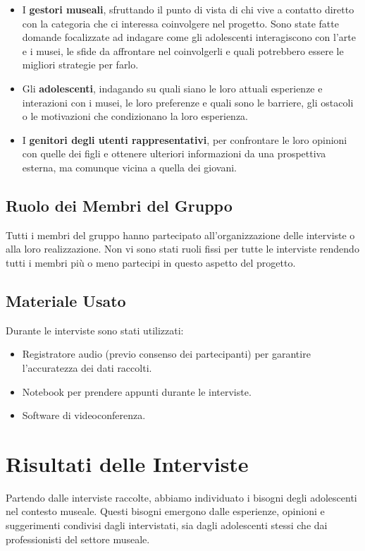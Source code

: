 \documentclass{article}
\begin{document}
\begin{itemize}
    \item I \textbf{gestori museali}, sfruttando il punto di vista di chi vive a contatto diretto con la categoria che ci interessa coinvolgere nel progetto. Sono state fatte domande focalizzate ad indagare come gli adolescenti interagiscono con l'arte e i musei, le sfide da affrontare nel coinvolgerli e quali potrebbero essere le migliori strategie per farlo.
    \item Gli \textbf{adolescenti}, indagando su quali siano le loro attuali esperienze e interazioni con i musei, le loro preferenze e quali sono le barriere, gli ostacoli o le motivazioni che condizionano la loro esperienza.
    \item I \textbf{genitori degli utenti rappresentativi}, per confrontare le loro opinioni con quelle dei figli e ottenere ulteriori informazioni da una prospettiva esterna, ma comunque vicina a quella dei giovani.
\end{itemize}

\subsection{Ruolo dei Membri del Gruppo}

Tutti i membri del gruppo hanno partecipato all'organizzazione delle interviste o alla loro realizzazione. Non vi sono stati ruoli fissi per tutte le interviste rendendo tutti i membri più o meno partecipi in questo aspetto del progetto.

\subsection{Materiale Usato}

Durante le interviste sono stati utilizzati:

\begin{itemize}
    \item Registratore audio (previo consenso dei partecipanti) per garantire l'accuratezza dei dati raccolti.
    \item Notebook per prendere appunti durante le interviste.
    \item Software di videoconferenza.
\end{itemize}

\section{Risultati delle Interviste}
Partendo dalle interviste raccolte, abbiamo individuato i bisogni degli adolescenti nel contesto museale. Questi bisogni emergono dalle esperienze, opinioni e suggerimenti condivisi dagli intervistati, sia dagli adolescenti stessi che dai professionisti del settore museale.
\end{document}
